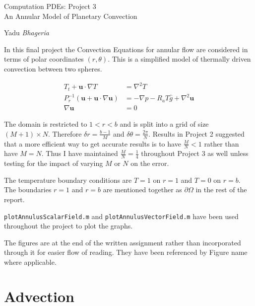 \documentclass{article}
\begin{document}
\begin{center}
    
    {\Huge Computation PDEs: Project 3}\\
    {\Huge An Annular Model of Planetary Convection}
    \vspace{0.5cm}
    
    {\LARGE Yadu \emph{Bhageria}}\\
    \vspace{0.2cm}
    
\end{center}

In this final project the Convection Equations for annular flow are considered in terms of polar coordinates $(r, \theta)$. This is a simplified model of thermally driven convection between two spheres.

\begin{align}
	T_t + \textbf{u} \cdot \nabla T &= \nabla^2 T \\
	P_r^{−1} (\textbf{u} + \textbf{u} \cdot \nabla \textbf{u}) &= − \nabla p − R_a T\hat{g} + \nabla^2 \textbf{u} \\
	\nabla \textbf{u} &= 0
\end{align}

The domain is restricted to $1 < r < b$ and is split into a grid of size $(M+1) \times N$. Therefore $\delta r = \frac{b-1}{M}$ and $\delta \theta = \frac{2 \pi}{N}$. Results in Project 2 suggested that a more efficient way to get accurate results is to have $\frac{M}{N} < 1$ rather than have $M=N$. Thus I have maintained $\frac{M}{N} = \frac{1}{4}$ throughout Project 3 as well unless testing for the impact of varying $M$ or $N$ on the error. 

The temperature boundary conditions are $T = 1$ on $r = 1$ and $T = 0$ on $r = b$. The boundaries $r=1$ and $r=b$ are mentioned together as $\partial \Omega$ in the rest of the report. 

\texttt{plotAnnulusScalarField.m} and \texttt{plotAnnulusVectorField.m} have been used throughout the project to plot the graphs.

The figures are at the end of the written assignment rather than incorporated through it for easier flow of reading. They have been referenced by Figure name where applicable.

\section{Advection}
\end{document}
